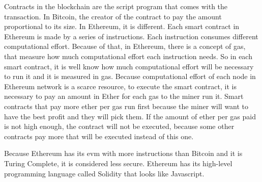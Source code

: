 Contracts in the blockchain are the script program that comes with the transaction.
In Bitcoin, the creator of the contract to pay the amount proportional to its size.
In Ethereum, it is different.
Each smart contract in Ethereum is made by a series of instructions.
Each instruction consumes different computational effort.
Because of that, in Ethereum, there is a concept of gas, that measure how much computational effort
each instruction needs.
So in each smart contract, it is well know how much computational effort will be necessary to run it
and it is measured in gas.
Because computational effort of each node in Ethereum network is a scarce resource,
to execute the smart contract, it is necessary to
pay an amount in Ether for each gas to the miner run it.
Smart contracts that pay more ether per gas run first because the miner will want to have the best
profit and they will pick them.
If the amount of ether per gas paid is not high enough, the contract will not be executed,
because some other contracts pay more that will be executed instead of this one.

Because Ethereum has its \gls{evm} with more instructions than Bitcoin and it is Turing Complete,
it is considered less secure.
Ethereum has its high-level programming language called Solidity that looks like Javascript.
